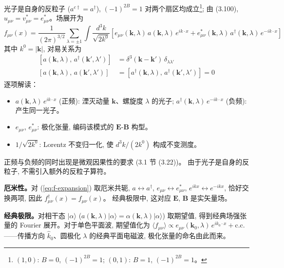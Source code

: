 光子是自身的反粒子 ($a^{c\dagger}=a^\dagger$),
$(-1)^{2B}=1$ 对两个扇区均成立\footnote{%
$(1,0)$: $B=0$, $(-1)^{2B}=1$; $(0,1)$: $B=1$, $(-1)^{2B}=1$。};
由 (3.100), $u_{\mu\nu}=v_{\mu\nu}^*=e^*_{\mu\nu}$。场展开为
\begin{equation}
    \boxed{
    f_{\mu\nu}(x) = \frac{1}{(2\pi)^{3/2}} \sum_{\lambda=\pm 1} 
    \int \frac{d^3k}{\sqrt{2k^0}}
    \left[e_{\mu\nu}(\mathbf{k},\lambda)\,a(\mathbf{k},\lambda)\,e^{ik\cdot x}
    + e^*_{\mu\nu}(\mathbf{k},\lambda)\,a^\dagger(\mathbf{k},\lambda)\,e^{-ik\cdot x}\right]
    }
    \label{eq:f-expansion}
\end{equation}
其中 $k^0=|\mathbf{k}|$, 对易关系为
\begin{subequations}\label{eq:photon-ccr}
\begin{align}
    [a(\mathbf{k},\lambda),\,a^\dagger(\mathbf{k}',\lambda')] 
    &= \delta^3(\mathbf{k}-\mathbf{k}')\,\delta_{\lambda\lambda'} \\
    [a(\mathbf{k},\lambda),\,a(\mathbf{k}',\lambda')] 
    &= [a^\dagger(\mathbf{k},\lambda),\,a^\dagger(\mathbf{k}',\lambda')] = 0
\end{align}
\end{subequations}
逐项解读：
\begin{itemize}
    \item $a(\mathbf{k},\lambda)\,e^{ik\cdot x}$ (正频): 湮灭动量 $\mathbf{k}$、螺旋度 $\lambda$ 的光子;
    $a^\dagger(\mathbf{k},\lambda)\,e^{-ik\cdot x}$ (负频): 产生同一光子。
    \item $e_{\mu\nu}$, $e^*_{\mu\nu}$: 极化张量, 编码该模式的 $\boldsymbol{E}$-$\boldsymbol{B}$ 构型。
    \item $1/\sqrt{2k^0}$: Lorentz 不变归一化, 使 $d^3k/(2k^0)$ 构成不变测度。
\end{itemize}
正频与负频的同时出现是微观因果性的要求 (3.1 节 (3.22))。
由于光子是自身的反粒子, 不需引入额外的反粒子算符。

\textbf{厄米性。}对 (\ref{eq:f-expansion}) 取厄米共轭,
$a\leftrightarrow a^\dagger$, $e_{\mu\nu}\leftrightarrow e^*_{\mu\nu}$,
$e^{ikx}\leftrightarrow e^{-ikx}$, 恰好交换两项, 因此
$f_{\mu\nu}^\dagger(x) = f_{\mu\nu}(x)$。
经典极限中, 这对应 $\boldsymbol{E}$, $\boldsymbol{B}$ 是实矢量场。

\textbf{经典极限。}对相干态 $|\alpha\rangle$
($a(\mathbf{k},\lambda)|\alpha\rangle = \alpha(\mathbf{k},\lambda)|\alpha\rangle$) 取期望值,
得到经典场强张量的 Fourier 展开。对于单色平面波, 期望值化为
$\langle f_{\mu\nu}\rangle \propto e_{\mu\nu}(\mathbf{k}_0,\lambda)\,e^{ik_0\cdot x} + \text{c.c.}$
——传播方向 $\hat{k}_0$、圆极化 $\lambda$ 的经典平面电磁波, 极化张量的命名由此而来。

